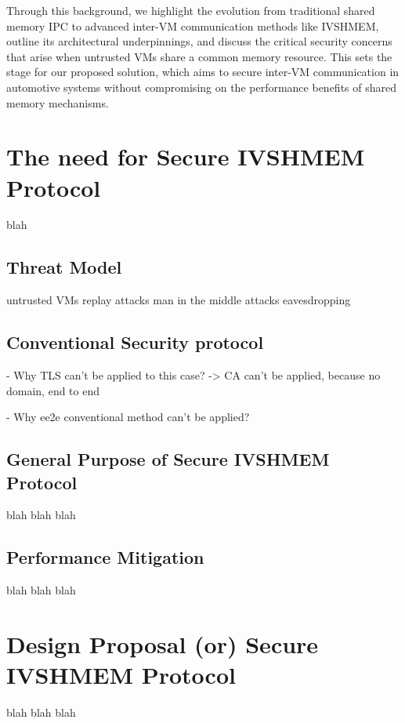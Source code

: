 \documentclass[letterpaper,twocolumn,10pt]{article}
\begin{document}
Through this background, we highlight the evolution from traditional shared memory IPC to advanced inter-VM communication methods like IVSHMEM, outline its architectural underpinnings, and discuss the critical security concerns that arise when untrusted VMs share a common memory resource. This sets the stage for our proposed solution, which aims to secure inter-VM communication in automotive systems without compromising on the performance benefits of shared memory mechanisms.




\section{The need for Secure IVSHMEM Protocol}

blah

\subsection{Threat Model}


untrusted VMs
replay attacks
man in the middle attacks
eavesdropping


\subsection{Conventional Security protocol}
- Why TLS can't be applied to this case? -> CA can't be applied, because no domain, end to end

- Why ee2e conventional method can't be applied?




\subsection{General Purpose of Secure IVSHMEM Protocol}

blah blah blah

\subsection{Performance Mitigation}

blah blah blah



\section{Design Proposal (or) Secure IVSHMEM Protocol}

blah blah blah
\end{document}

